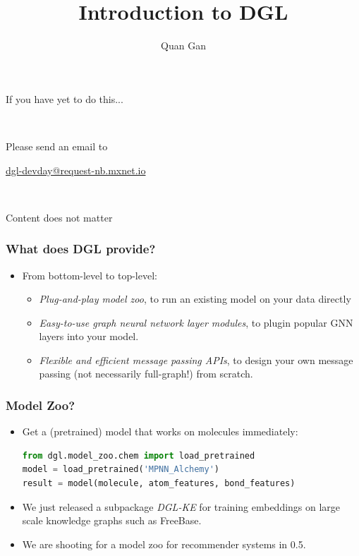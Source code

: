 \documentclass[10pt,aspectratio=169]{beamer}
\begin{document}
	\author{Quan Gan}
	\title{Introduction to DGL}
	\begin{frame}
		\begin{center}
			\centering
			If you have yet to do this...
			
			~
			
			\Large Please send an email to
			
			\Huge \url{dgl-devday@request-nb.mxnet.io}
			
			~
			
			\normalsize Content does not matter
		\end{center}
	\end{frame}
	
	\begin{frame}[plain]
		\maketitle
	\end{frame}

	\begin{frame}
		\frametitle{What does DGL provide?}
		\begin{itemize}
			\item From bottom-level to top-level:
			\begin{itemize}
				\item \emph{Plug-and-play model zoo}, to run an existing model on your data directly
				\item \emph{Easy-to-use graph neural network layer modules}, to plugin popular GNN layers into your model.
				\item \emph{Flexible and efficient message passing APIs}, to design your own message passing (not necessarily full-graph!) from scratch.
			\end{itemize}
		\end{itemize}
	\end{frame}
	
	\begin{frame}[fragile]
		\frametitle{Model Zoo?}
		\begin{itemize}
			\item Get a (pretrained) model that works on molecules immediately:
\begin{lstlisting}[language=Python]
from dgl.model_zoo.chem import load_pretrained
model = load_pretrained('MPNN_Alchemy')
result = model(molecule, atom_features, bond_features)
\end{lstlisting}
			\item We just released a subpackage \emph{DGL-KE} for training embeddings on large scale knowledge graphs such as FreeBase.
			\item We are shooting for a model zoo for recommender systems in 0.5.
		\end{itemize}
	\end{frame}
\end{document}
